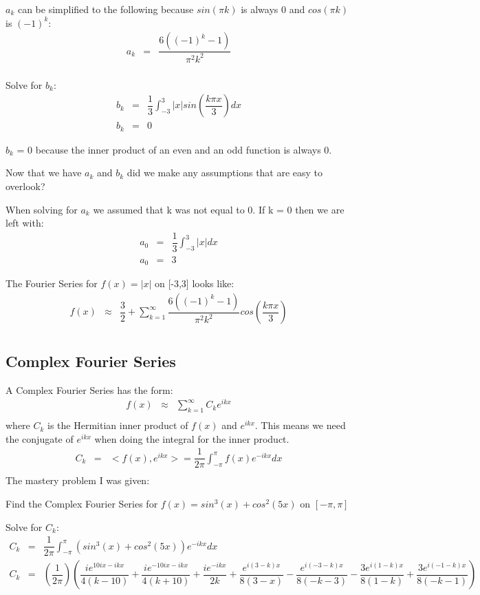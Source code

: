 \documentclass{article}
\newcommand{\bea}{\begin{eqnarray*}}
\newcommand{\eea}{\end{eqnarray*}}
\newcommand{\blue}[1]{\textcolor{blue}{#1}}
\begin{document}
$a_k$ can be simplified to the following because $sin(\pi k)$ is always 0 and $cos(\pi k)$ is $(-1)^k$:
\bea
a_k &=& \dfrac{6((-1)^k-1)}{\pi^2 k^2}\\
\eea

Solve for $b_k$:
\bea
b_k &=& \dfrac{1}{3}\int_{-3}^{3} |x|sin(\dfrac{k \pi x}{3})dx\\
b_k &=& 0
\eea

$b_k$ = 0 because the inner product of an even and an odd function is always 0.\newline 

Now that we have $a_k$ and $b_k$ did we make any assumptions that are easy to overlook?\newline

When solving for $a_k$ we assumed that k was not equal to 0. If k = 0 then we are left with:
\bea
a_0 &=& \dfrac{1}{3}\int_{-3}^{3} |x|dx\\
a_0 &=& 3
\eea

The Fourier Series for $f(x) = |x|$ on [-3,3] looks like:
\bea
f(x) &\approx& \dfrac{3}{2}+\sum_{k=1}^{\infty} \dfrac{6((-1)^k-1)}{\pi^2 k^2}cos(\dfrac{k \pi x}{3}) \\
\eea

\subsection{Complex Fourier Series}
A Complex Fourier Series has the form:
\bea
f(x) &\approx& \sum_{k=1}^{\infty} C_ke^{ikx} \\
\eea
where $C_k$ is the Hermitian inner product of $f(x)$ and $e^{ikx}$. This means we need the conjugate of $e^{ikx}$ when doing the integral for the inner product.
\bea
C_k &=& <f(x),e^{ikx}> = \dfrac{1}{2\pi}\int_{-\pi}^{\pi} f(x)e^{-ikx}dx \\
\eea
The mastery problem I was given: \newline

Find the Complex Fourier Series for $f(x) = sin^3(x)+cos^2(5x)$ on $[-\pi,\pi]$

Solve for $C_k$:
\bea
C_k &=& \dfrac{1}{2\pi}\int_{-\pi}^{\pi} (sin^3(x)+cos^2(5x))e^{-ikx}dx\\
C_k &=& (\dfrac{1}{2\pi})(\dfrac{ie^{10ix-ikx}}{4(k-10)} + \dfrac{ie^{-10ix-ikx}}{4(k+10)} + \dfrac{ie^{-ikx}}{2k} + \dfrac{e^{i(3-k)x}}{8(3-x)} - \dfrac{e^{i(-3-k)x}}{8(-k-3)} - \dfrac{3e^{i(1-k)x}}{8(1-k)} + \dfrac{3e^{i(-1-k)x}}{8(-k-1)})
\eea
\end{document}
